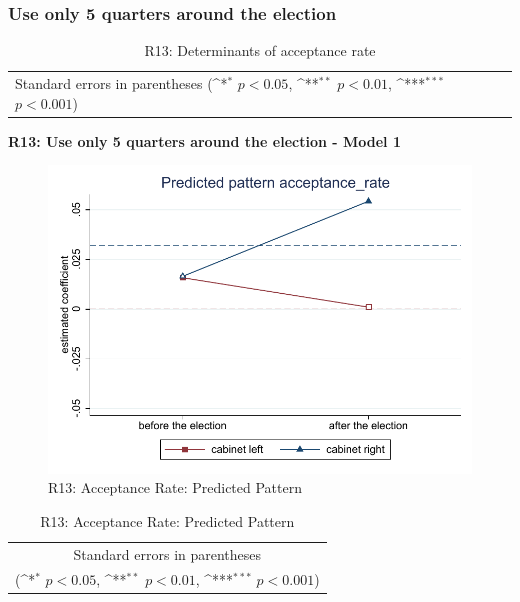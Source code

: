 \documentclass[10pt,a4paper]{scrartcl}
\begin{document}


\clearpage
\FloatBarrier
\subsubsection{Use only 5 quarters around the election}
\begin{table}[!ht]\centering
	\renewcommand{\arraystretch}{1.25}
	\small
	\def\sym#1{\ifmmode^{#1}\else\(^{#1}\)\fi}
	\caption{R13: Determinants of acceptance rate}
	\begin{tabular}{l*{3}{c}}
		\hline\hline
		
		\hline\hline
		\multicolumn{4}{l}{\footnotesize Standard errors in parentheses (\sym{*} \(p<0.05\), \sym{**} \(p<0.01\), \sym{***} \(p<0.001\))}\\
	\end{tabular}
\end{table}

\clearpage
\textbf{R13: Use only 5 quarters around the election - Model 1}
\begin{figure}[!ht]
	\centering
	\includegraphics[width=1\textwidth]{figures_edited/acceptance_rate_graph1_R13.pdf}
	\caption{R13: Acceptance Rate: Predicted Pattern}
\end{figure}

\begin{table}[!ht]\centering
	\renewcommand{\arraystretch}{1.25}
	\def\sym#1{\ifmmode^{#1}\else\(^{#1}\)\fi}
	\caption{R13: Acceptance Rate: Predicted Pattern}
	\begin{tabular}{l*{2}{c}}
		\hline\hline
		
		\hline\hline
		\multicolumn{3}{c}{\footnotesize Standard errors in parentheses} \\
		\multicolumn{3}{c}{\footnotesize (\sym{*} \(p<0.05\), \sym{**} \(p<0.01\), \sym{***} \(p<0.001\))}\\
	\end{tabular}
\end{table}
\end{document}
